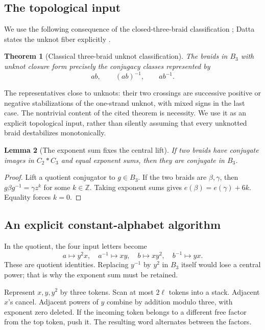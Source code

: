 \documentclass[11pt,letterpaper]{article}
\newtheorem{theorem}{Theorem}[section]
\newtheorem{lemma}[theorem]{Lemma}
\theoremstyle{definition}
\newcommand{\Z}{\mathbb Z}
\begin{document}
\subsection{The topological input}

We use the following consequence of the closed-three-braid classification
\cite{birmanmenasco}; Datta states the unknot fiber explicitly
\cite[Theorem 4.1(i)]{datta2022}.

\begin{theorem}[Classical three-braid unknot classification]
\label{thm:classical}
The braids in \(B_3\) with unknot closure form precisely the conjugacy
classes represented by
\[
 ab,\qquad (ab)^{-1},\qquad ab^{-1}.
\]
\end{theorem}

The representatives close to unknots: their two crossings are successive
positive or negative stabilizations of the one-strand unknot, with mixed
signs in the last case. The nontrivial content of the cited theorem is
necessity. We use it as an explicit topological input, rather than
silently assuming that every unknotted braid destabilizes monotonically.

\begin{lemma}[The exponent sum fixes the central lift]
\label{lem:lift}
If two braids have conjugate images in \(C_2*C_3\) and equal exponent
sums, then they are conjugate in \(B_3\).
\end{lemma}
\begin{proof}
Lift a quotient conjugator to \(g\in B_3\). If the two braids are
\(\beta,\gamma\), then
\(g\beta g^{-1}=\gamma z^k\) for some \(k\in\Z\).
Taking exponent sums gives \(e(\beta)=e(\gamma)+6k\).
Equality forces \(k=0\).
\end{proof}

\subsection{An explicit constant-alphabet algorithm}

In the quotient, the four input letters become
\begin{equation}
\label{eq:images}
 a\mapsto y^2x,\quad a^{-1}\mapsto xy,\quad
 b\mapsto xy^2,\quad b^{-1}\mapsto yx.
\end{equation}
These are quotient identities. Replacing \(y^{-1}\) by \(y^2\) in
\(B_3\) itself would lose a central power; that is why the exponent sum
must be retained.

Represent \(x,y,y^2\) by three tokens. Scan at most \(2\ell\) tokens into
a stack. Adjacent \(x\)'s cancel. Adjacent powers of \(y\) combine by
addition modulo three, with exponent zero deleted. If the incoming token
belongs to a different free factor from the top token, push it.
The resulting word alternates between the factors.
\end{document}
